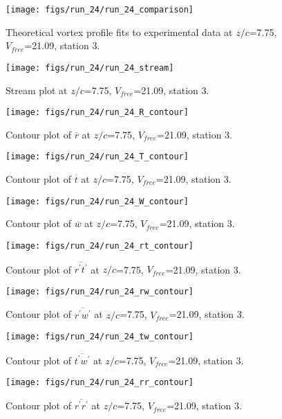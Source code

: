 \begin{figure}[H]
\centering
\texttt{[image: figs/run\_24/run\_24\_comparison]}
\caption{Theoretical vortex profile fits to experimental data at $z/c$=7.75, $V_{free}$=21.09, station 3.}
\end{figure}


\begin{figure}[H]
\centering
\texttt{[image: figs/run\_24/run\_24\_stream]}
\caption{Stream plot at $z/c$=7.75, $V_{free}$=21.09, station 3.}
\end{figure}


\begin{figure}[H]
\centering
\texttt{[image: figs/run\_24/run\_24\_R\_contour]}
\caption{Contour plot of $\overline{r}$ at $z/c$=7.75, $V_{free}$=21.09, station 3.}
\end{figure}


\begin{figure}[H]
\centering
\texttt{[image: figs/run\_24/run\_24\_T\_contour]}
\caption{Contour plot of $\overline{t}$ at $z/c$=7.75, $V_{free}$=21.09, station 3.}
\end{figure}


\begin{figure}[H]
\centering
\texttt{[image: figs/run\_24/run\_24\_W\_contour]}
\caption{Contour plot of $\overline{w}$ at $z/c$=7.75, $V_{free}$=21.09, station 3.}
\end{figure}


\begin{figure}[H]
\centering
\texttt{[image: figs/run\_24/run\_24\_rt\_contour]}
\caption{Contour plot of $\overline{r^\prime t^\prime}$ at $z/c$=7.75, $V_{free}$=21.09, station 3.}
\end{figure}


\begin{figure}[H]
\centering
\texttt{[image: figs/run\_24/run\_24\_rw\_contour]}
\caption{Contour plot of $\overline{r^\prime w^\prime}$ at $z/c$=7.75, $V_{free}$=21.09, station 3.}
\end{figure}


\begin{figure}[H]
\centering
\texttt{[image: figs/run\_24/run\_24\_tw\_contour]}
\caption{Contour plot of $\overline{t^\prime w^\prime}$ at $z/c$=7.75, $V_{free}$=21.09, station 3.}
\end{figure}


\begin{figure}[H]
\centering
\texttt{[image: figs/run\_24/run\_24\_rr\_contour]}
\caption{Contour plot of $\overline{r^\prime r^\prime}$ at $z/c$=7.75, $V_{free}$=21.09, station 3.}
\end{figure}


